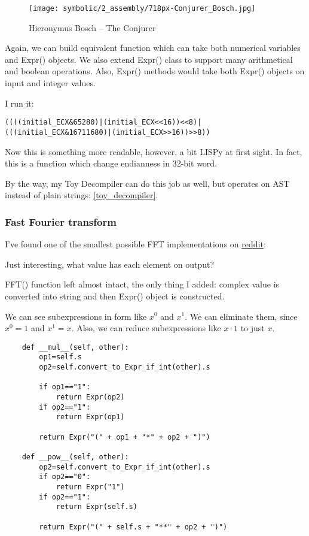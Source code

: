 \begin{figure}[H]
\centering
\texttt{[image: symbolic/2\_assembly/718px-Conjurer\_Bosch.jpg]}
\caption{Hieronymus Bosch -- The Conjurer}
\end{figure}

Again, we can build equivalent function which can take both numerical variables and Expr() objects.
We also extend Expr() class to support many arithmetical and boolean operations.
Also, Expr() methods would take both Expr() objects on input and integer values.



I run it:

\begin{lstlisting}
((((initial_ECX&65280)|(initial_ECX<<16))<<8)|(((initial_ECX&16711680)|(initial_ECX>>16))>>8))
\end{lstlisting}

Now this is something more readable, however, a bit LISPy at first sight.
In fact, this is a function which change endianness in 32-bit word.

By the way, my Toy Decompiler can do this job as well, but operates on \ac{AST} instead
of plain strings: \ref{toy_decompiler}.

\subsubsection{Fast Fourier transform}

I've found one of the smallest possible FFT implementations on \href{https://www.reddit.com/r/Python/comments/1la4jp/understanding_the_fft_algorithm_with_python/}{reddit}:



Just interesting, what value has each element on output?



FFT() function left almost intact, the only thing I added: complex value is converted into string and then
Expr() object is constructed.



We can see subexpressions in form like $x^0$ and $x^1$.
We can eliminate them, since $x^0=1$ and $x^1=x$.
Also, we can reduce subexpressions like $x \cdot 1$ to just $x$.

\begin{lstlisting}
    def __mul__(self, other):
        op1=self.s
        op2=self.convert_to_Expr_if_int(other).s

        if op1=="1":
            return Expr(op2)
        if op2=="1":
            return Expr(op1)

        return Expr("(" + op1 + "*" + op2 + ")")

    def __pow__(self, other):
        op2=self.convert_to_Expr_if_int(other).s
        if op2=="0":
            return Expr("1")
        if op2=="1":
            return Expr(self.s)

        return Expr("(" + self.s + "**" + op2 + ")")
\end{lstlisting}

